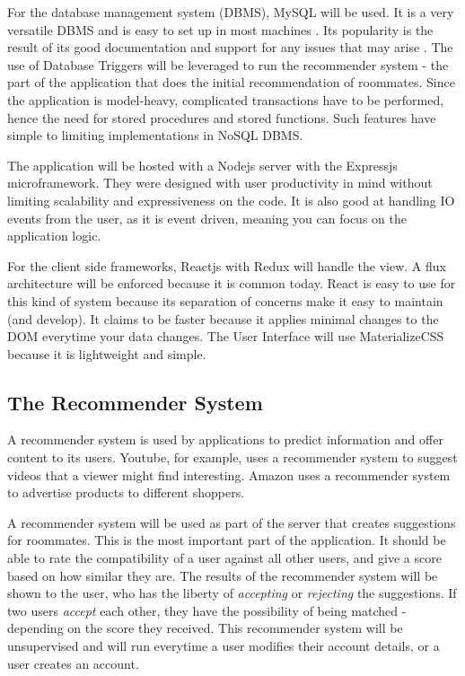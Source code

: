 \documentclass[journal]{./IEEE/IEEEtran}
\begin{document}
For the database management system (DBMS), MySQL will be used. It is a very versatile DBMS and is easy to set up in most machines \cite{mysqlpage}. Its popularity is the result of its good documentation and support for any issues that may arise \cite{mysqlpage}. The use of Database Triggers will be leveraged to run the recommender system - the part of the application that does the initial recommendation of roommates. Since the application is model-heavy, complicated transactions have to be performed, hence the need for stored procedures and stored functions. Such features have simple to limiting implementations in NoSQL DBMS.

The application will be hosted with a Nodejs server with the Expressjs microframework. They were designed with user productivity in mind without limiting scalability and expressiveness on the code. It is also good at handling IO events from the user, as it is event driven, meaning you can focus on the application logic.

For the client side frameworks, Reactjs with Redux will handle the view. A flux architecture will be enforced because it is common today. React is easy to use for this kind of system because its separation of concerns make it easy to maintain (and develop). It claims to be faster because it applies minimal changes to the DOM everytime your data changes. The User Interface will use MaterializeCSS because it is lightweight and simple.

\subsection{The Recommender System}
A recommender system is used by applications to predict information and offer content to its users\cite{katarya}. Youtube, for example, uses a recommender system to suggest videos that a viewer might find interesting. Amazon uses a recommender system to advertise products to different shoppers.

A recommender system will be used as part of the server that creates suggestions for roommates. This is the most important part of the application. It should be able to rate the compatibility of a user against all other users, and give a score based on how similar they are. The results of the recommender system will be shown to the user, who has the liberty of \textit{accepting} or \textit{rejecting} the suggestions. If two users \textit{accept} each other, they have the possibility of being matched - depending on the score they received. This recommender system will be unsupervised and will run everytime a user modifies their account details, or a user creates an account.
\end{document}
